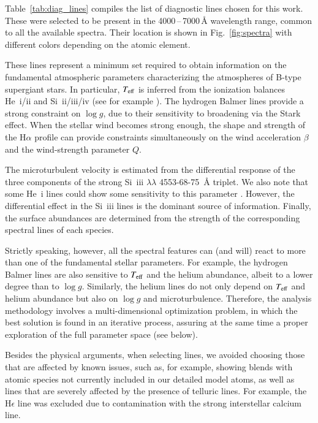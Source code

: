 \documentclass{aa}
\newcommand{\Teff}{\mbox{$T_{\rm eff}$}\xspace}
\newcommand{\logg}{\mbox{$\log g$}\xspace}
\let\oldAA\AA
\renewcommand*{\AA}{\,\oldAA\xspace}
\begin{document}
Table~\ref{tab:diag_lines} compiles the list of diagnostic lines chosen for this work. These were selected to be present in the 4000\,--\,7000\AA wavelength range, common to all the available spectra. Their location is shown in Fig.~\ref{fig:spectra} with different colors depending on the atomic element. 

These lines represent a minimum set required to obtain information on the fundamental atmospheric parameters characterizing the atmospheres of B-type supergiant stars. In particular, \Teff is inferred from the ionization balances He~{\sc i/ii} and Si~{\sc ii/iii/iv} (see for example \citealt{mcerlean99, urbaneja05b}). The hydrogen Balmer lines provide a strong constraint on \logg, due to their sensitivity to broadening via the Stark effect. When the stellar wind becomes strong enough, the shape and strength of the H$\alpha$ profile can provide constraints simultaneously on the wind acceleration $\beta$ and the wind-strength parameter $Q$.

The microturbulent velocity is estimated from the differential response of the three components of the strong Si~{\sc iii} $\lambda\lambda$ 4553-68-75 {\AA} triplet. We also note that some He~{\sc i} lines could show some sensitivity to this parameter \citep{mcerlean99}. However, the differential effect in the Si~{\sc iii} lines is the dominant source of information. Finally, the surface abundances are determined from the strength of the corresponding spectral lines of each species.

Strictly speaking, however, all the spectral features can (and will) react to more than one of the fundamental stellar parameters. For example, the hydrogen Balmer lines are also sensitive to \Teff and the helium abundance, albeit to a lower degree than to \logg. Similarly, the helium lines do not only depend on \Teff and helium abundance but also on \logg and microturbulence. Therefore, the analysis methodology involves a multi-dimensional optimization problem, in which the best solution is found in an iterative process, assuring at the same time a proper exploration of the full parameter space (see below).

Besides the physical arguments, when selecting lines, we avoided choosing those that are affected by known issues, such as, for example, showing blends with atomic species not currently included in our detailed model atoms, as well as lines that are severely affected by the presence of telluric lines. For example, the H$\epsilon$ line was excluded due to contamination with the strong interstellar calcium line.
\end{document}
